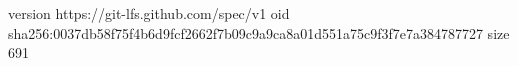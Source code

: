 version https://git-lfs.github.com/spec/v1
oid sha256:0037db58f75f4b6d9fcf2662f7b09c9a9ca8a01d551a75c9f3f7e7a384787727
size 691
